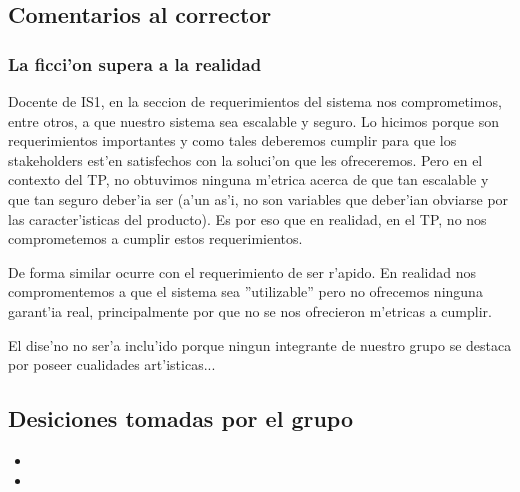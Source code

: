 \subsection{Comentarios al corrector}
\subsubsection{La ficci'on supera a la realidad}
Docente de IS1, en la seccion de requerimientos del sistema nos comprometimos, entre otros, a que nuestro sistema sea escalable y seguro. Lo hicimos porque son requerimientos importantes y como tales deberemos cumplir para que los stakeholders est'en satisfechos con la soluci'on que les ofreceremos. Pero en el contexto del TP, no obtuvimos ninguna m'etrica acerca de que tan escalable y que tan seguro deber'ia ser (a'un as'i, no son variables que deber'ian obviarse por las caracter'isticas del producto). Es por eso que en realidad, en el TP, no nos comprometemos a cumplir estos requerimientos. 

De forma similar ocurre con el requerimiento de ser r'apido. En realidad nos compromentemos a que el sistema sea ''utilizable'' pero no ofrecemos ninguna garant'ia real, principalmente por que no se nos ofrecieron m'etricas a cumplir.

El dise'no no ser'a inclu'ido porque ningun integrante de nuestro grupo se destaca por poseer cualidades art'isticas...





\subsection{Desiciones tomadas por el grupo}
\begin{itemize}
\item 
\item 

\end{itemize}
